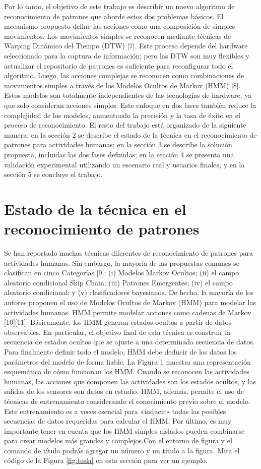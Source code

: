\documentclass[a4paper]{article}
\begin{document}
Por lo tanto, el objetivo de este trabajo es describir un nuevo algoritmo de reconocimiento de patrones que aborde estos dos problemas básicos. El mecanismo propuesto define las acciones como una composición de simples movimientos. Los movimientos simples se reconocen mediante técnicas de Warping Dinámico del Tiempo (DTW) [7]. Este proceso depende del hardware seleccionado para la captura de información; pero las DTW son muy flexibles y actualizar el repositorio de patrones es suficiente para reconfigurar todo el algoritmo. Luego, las acciones complejas se reconocen como combinaciones de movimientos simples a través de los Modelos Ocultos de Markov (HMM) [8]. Estos modelos son totalmente independientes de las tecnologías de hardware, ya que solo consideran acciones simples. Este enfoque en dos fases también reduce la complejidad de los modelos, aumentando la precisión y la tasa de éxito en el proceso de reconocimiento.
El resto del trabajo está organizado de la siguiente manera: en la sección 2 se describe el estado de la técnica en el reconocimiento de patrones para actividades humanas; en la sección 3 se describe la solución propuesta, incluidas las dos fases definidas; en la sección 4 se presenta una validación experimental utilizando un escenario real y usuarios finales; y en la sección 5 se concluye el trabajo.

\section{Estado de la técnica en el reconocimiento de patrones}

Se han reportado muchas técnicas diferentes de reconocimiento de patrones para actividades humanas. Sin embargo, la mayoría de las propuestas comunes se clasifican en cinco
Categorías [9]: (i) Modelos Markov Ocultos; (ii) el campo aleatorio condicional Skip Chain; (iii) Patrones Emergentes; (iv) el campo aleatorio condicional; y (v) clasificadores bayesianos.
De hecho, la mayoría de los autores proponen el uso de Modelos Ocultos de Markov (HMM) para modelar las actividades humanas. HMM permite modelar acciones como cadenas de Markov [10][11]. Básicamente, los HMM generan estados ocultos a partir de datos observables. En particular, el objetivo final de esta técnica es construir la secuencia de estados ocultos que se ajuste a una determinada secuencia de datos. Para finalmente definir todo el modelo, HMM debe deducir de los datos los parámetros del modelo de forma fiable. La Figura 1 muestra una representación esquemática de cómo funcionan los HMM. Cuando se reconocen las actividades humanas, las acciones que componen las actividades son los estados ocultos, y las salidas de los sensores son datos en estudio. HMM, además, permite el uso de técnicas de entrenamiento considerando el conocimiento previo sobre el modelo. Este entrenamiento es a veces esencial para «inducir» todas las posibles secuencias de datos requeridas para calcular el HMM. Por último, es muy importante tener en cuenta que los HMM simples aislados pueden combinarse para crear modelos más grandes y complejos.Con el entorno de figura y el comando de título podrás agregar un número y un título a la figura. Mira el código de la Figura \ref{fig:tesla} en esta sección para ver un ejemplo.
\end{document}
